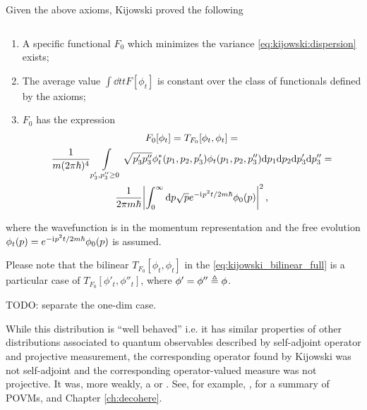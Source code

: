 Given the above axioms, Kijowski proved the following
\begin{theorem}
  $\,$

  \begin{enumerate}
    \item
      A specific functional $F_0$ which minimizes the variance
      \eqref{eq:kijowski:dispersion}
      exists;
    \item
      The average value $\int \dd{t} t F[\phi_t] $ is constant over the class of
      functionals defined by the axioms;
    \item
      $F_0$ has the expression
      \begin{multline}\label{eq:kijowski_bilinear_full}
        F_0[\phi_t] = T_{F_0}[\phi_t, \phi_t] = \\
            \frac{1}{m(2\pi\hbar)^4}
            \int\displaylimits_{p_{3}', p_{3}'' \ge 0} \sqrt{p_{3}' p_{3}''} \phi_t^{*}(p_1, p_2, p_{3}') \phi_t(p_1, p_2, p_{3}'')
            \dd p_1 \dd p_2 \dd p_{3}' \dd p_{3}''
            = \\
                      \frac{1}{2 \pi m \hbar} \abs{\int_0^{\infty} \dd p \sqrt{p} e^{-\mathrm{i}\mkern1mu p^{2} t / 2m\hbar} \phi_{0}(p)}^2
                      \, \text{,}
      \end{multline}
  \end{enumerate}
  where the wavefunction is in the momentum representation and the free evolution
  $\phi_t(p) = e^{-\mathrm{i}\mkern1mu p^{2} t / 2m\hbar}\phi_{0}(p)$
  is assumed.
\end{theorem}

Please note that the bilinear $T_{F_0}[\phi_t, \phi_t]$ in the \eqref{eq:kijowski_bilinear_full}
is a particular case of $T_{F_0}[\phi'_t, \phi''_t]$, where $\phi' = \phi'' \triangleq \phi$.

TODO: separate the one-dim case.

While this distribution is ``well behaved'' i.e. it has similar properties of other distributions
associated to quantum observables described by self-adjoint operator and projective measurement,
the corresponding operator found by Kijowski was not self-adjoint and the corresponding
operator-valued measure was not projective.
It was, more weakly, a  or .
See, for example, \cite[Sec. 10.3]{TQM1},
for a summary of POVMs, and Chapter \ref{ch:decohere}.

